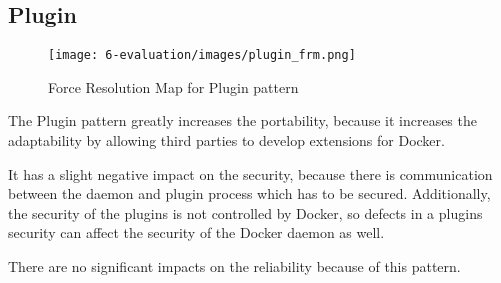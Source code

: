 \subsection{Plugin}
\begin{figure}[H]
\centering
\texttt{[image: 6-evaluation/images/plugin\_frm.png]}
\caption{Force Resolution Map for Plugin pattern}
\label{fig:plugin-frm}
\end{figure}
The Plugin pattern greatly increases the portability, because it increases the adaptability by allowing third parties to develop extensions for Docker. 

It has a slight negative impact on the security, because there is communication between the daemon and plugin process which has to be secured. Additionally, the security of the plugins is not controlled by Docker, so defects in a plugins security can affect the security of the Docker daemon as well. 

There are no significant impacts on the reliability because of this pattern.

